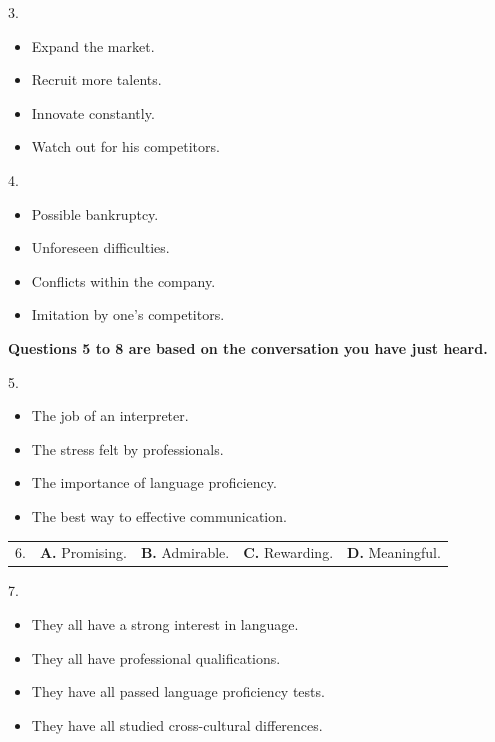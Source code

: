 \documentclass[UTF8,11pt]{ctexart}
\begin{document}
3.


\begin{itemize}[leftmargin=2em,itemsep=.2em,topsep=.4em]\item[A.] Expand the market.
\item[B.] Recruit more talents.
\item[C.] Innovate constantly.
\item[D.] Watch out for his competitors.
\end{itemize}

4.


\begin{itemize}[leftmargin=2em,itemsep=.2em,topsep=.4em]\item[A.] Possible bankruptcy.
\item[B.] Unforeseen difficulties.
\item[C.] Conflicts within the company.
\item[D.] Imitation by one's competitors.
\end{itemize}

\textbf{Questions 5 to 8 are based on the conversation you have just heard.}


5.


\begin{itemize}[leftmargin=2em,itemsep=.2em,topsep=.4em]\item[A.] The job of an interpreter.
\item[B.] The stress felt by professionals.
\item[C.] The importance of language proficiency.
\item[D.] The best way to effective communication.
\end{itemize}

\noindent\begin{tabularx}{\linewidth}{@{}lXXXX@{}}6. & \textbf{A.} Promising. & \textbf{B.} Admirable. & \textbf{C.} Rewarding. & \textbf{D.} Meaningful.\\\end{tabularx}\par

7.


\begin{itemize}[leftmargin=2em,itemsep=.2em,topsep=.4em]\item[A.] They all have a strong interest in language.
\item[B.] They all have professional qualifications.
\item[C.] They have all passed language proficiency tests.
\item[D.] They have all studied cross-cultural differences.
\end{itemize}
\end{document}
